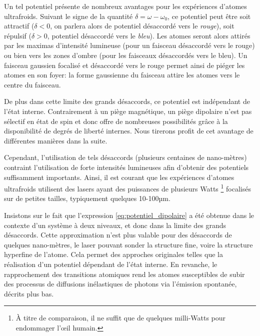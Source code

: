 Un tel potentiel présente de nombreux avantages pour les expériences d'atomes ultrafroids. Suivant le signe de la quantité $\delta = \omega-\omega_0$, ce potentiel peut être soit attractif ($\delta<0$, on parlera alors de potentiel désaccordé vers le \emph{rouge}), soit répulsif ($\delta>0$, potentiel désaccordé vers le \emph{bleu}). Les atomes seront alors attirés par les maximas d'intensité lumineuse (pour un faisceau désaccordé vers le rouge) ou bien vers les zones d'ombre (pour les faisceaux désaccordés vers le bleu). Un faisceau gaussien focalisé et désaccordé vers le rouge permet ainsi de piéger les atomes en son foyer: la forme gaussienne du faisceau attire les atomes vers le centre du faisceau. 

De plus dans cette limite des grands désaccords, ce potentiel est indépendant de l'état interne. Contrairement à un piège magnétique, un piège dipolaire n'est pas sélectif en état de spin et donc offre de nombreuses possibilités grâce à la disponibilité de degrés de liberté internes. Nous tirerons profit de cet avantage de différentes manières dans la suite. 

Cependant, l'utilisation de tels désaccords (plusieurs centaines de nano-mètres) contraint l'utilisation de forte intensités lumineuses afin d'obtenir des potentiels suffisamment importants. Ainsi, il est courant que les expériences d'atomes ultrafroids utilisent des lasers ayant des puissances de plusieurs Watts \footnote{À titre de comparaison, il ne suffit que de quelques milli-Watts pour endommager l'œil humain.} focalisés sur de petites tailles, typiquement quelques 10-100µm. 

Insistons sur le fait que l'expression \ref{eq:potentiel_dipolaire} a été obtenue dans le contexte d'un système à deux niveaux, et donc dans la limite des grands désaccords. Cette approximation n'est plus valable pour des désaccords de quelques nano-mètres, le laser pouvant sonder la structure fine, voire la structure hyperfine de l'atome. Cela permet des approches originales telles que la réalisation d'un potentiel dépendant de l'état interne. En revanche, le rapprochement des transitions atomiques rend les atomes susceptibles de subir des processus de diffusions inélastiques de photons via l'émission spontanée, décrits plus bas.


